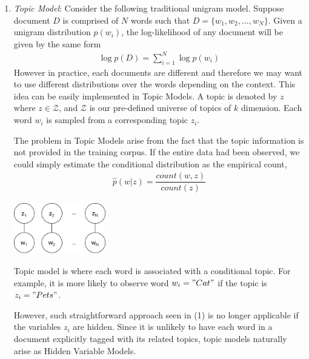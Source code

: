 \documentclass[justified, marginals=justified]{tufte-handout}
\theoremstyle{definition}
\begin{document}
\begin{enumerate}
	\item \textit{Topic Model}: Consider the following traditional unigram model. Suppose document $D$ is comprised of $N$ words such that $D=\{w_1, w_2, ..., w_N\}$. Given a unigram distribution $p(w_i)$, the log-likelihood of any document will be given by the same form 
	\begin{align*}
		\log p(D) = \sum_{i=1}^{N} \log p(w_i)
	\end{align*}
	However in practice, each documents are different and therefore we may want to use different distributions over the words depending on the context. 	
	 This idea can be easily implemented in Topic Models. A topic is denoted by $z$ where $z\in\mathcal{Z}$, and $\mathcal{Z}$ is our pre-defined universe of topics of $k$ dimension. Each word $w_i$ is sampled from a corresponding topic $z_i$. 
	 
	 The problem in Topic Models arise from the fact that the topic information is not provided in the training corpus. If the entire data had been observed, we could simply estimate the conditional distribution as the empirical count,
	\begin{align}
	\hat{p}(w|z) = \dfrac{count(w,z)}{count(z)}
	\end{align}
	
		\begin{marginfigure}[-3cm]%
			\centering
			\includegraphics[width=4cm]{topic-model-unigram.png}
			\caption{Topic model is where each word is associated with a conditional topic. For example, it is more likely to observe word $w_i="Cat"$ if the topic is $z_i="Pets"$.}
			\label{fig:topic-model-unigram}
		\end{marginfigure}
	
	However, such straightforward approach seen in (1) is no longer applicable if the variables $z_i$ are hidden. Since it is unlikely to have each word in a document explicitly tagged with its related topics, topic models naturally arise as Hidden Variable Models.
	

\end{enumerate}
\end{document}
